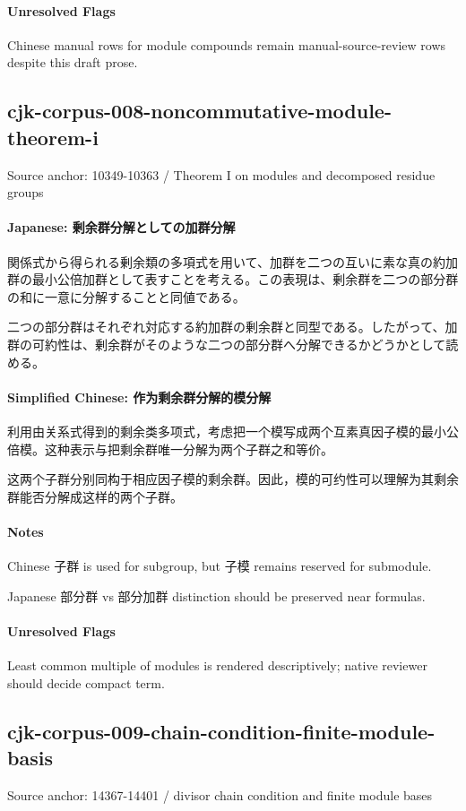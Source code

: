 \documentclass[11pt]{article}
\begin{document}
\paragraph{Unresolved Flags}
Chinese manual rows for module compounds remain manual-source-review rows despite this draft prose.\par
\subsection*{cjk-corpus-008-noncommutative-module-theorem-i}
Source anchor: 10349-10363 / Theorem I on modules and decomposed residue groups
\par
\paragraph{Japanese: 剰余群分解としての加群分解}
関係式から得られる剰余類の多項式を用いて、加群を二つの互いに素な真の約加群の最小公倍加群として表すことを考える。この表現は、剰余群を二つの部分群の和に一意に分解することと同値である。\par
二つの部分群はそれぞれ対応する約加群の剰余群と同型である。したがって、加群の可約性は、剰余群がそのような二つの部分群へ分解できるかどうかとして読める。\par
\paragraph{Simplified Chinese: 作为剩余群分解的模分解}
利用由关系式得到的剩余类多项式，考虑把一个模写成两个互素真因子模的最小公倍模。这种表示与把剩余群唯一分解为两个子群之和等价。\par
这两个子群分别同构于相应因子模的剩余群。因此，模的可约性可以理解为其剩余群能否分解成这样的两个子群。\par
\paragraph{Notes}
Chinese 子群 is used for subgroup, but 子模 remains reserved for submodule.\par
Japanese 部分群 vs 部分加群 distinction should be preserved near formulas.\par
\paragraph{Unresolved Flags}
Least common multiple of modules is rendered descriptively; native reviewer should decide compact term.\par
\subsection*{cjk-corpus-009-chain-condition-finite-module-basis}
Source anchor: 14367-14401 / divisor chain condition and finite module bases
\par
\end{document}
